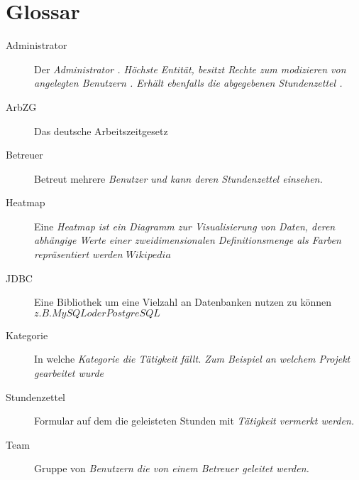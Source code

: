 \section{Glossar}
\begin{description}
	\item[Administrator] Der \em Administrator \em . Höchste Entität, besitzt Rechte zum modizieren von angelegten \em Benutzern \em .
	               Erhält ebenfalls die \em abgegebenen Stundenzettel \em .

	\item[ArbZG] Das deutsche Arbeitszeitgesetz

	\item[Betreuer] Betreut mehrere \em Benutzer \em  und kann deren \em Stundenzettel \em  einsehen.

	\item[Heatmap] Eine \em Heatmap \em  ist ein Diagramm zur Visualisierung von Daten, deren abhängige Werte einer zweidimensionalen Definitionsmenge als Farben repräsentiert werden \em \(Wikipedia\) \em

	\item[JDBC] Eine Bibliothek um eine Vielzahl an Datenbanken nutzen zu können \(z.B. MySQL oder PostgreSQL\)

	\item[Kategorie] In welche \em Kategorie \em  die \em Tätigkeit \em  fällt. Zum Beispiel an welchem Projekt gearbeitet wurde

	\item[Stundenzettel] Formular auf dem die geleisteten Stunden mit \em Tätigkeit \em  vermerkt werden.

	\item[Team] Gruppe von \em Benutzern \em  die von einem \em Betreuer \em  geleitet werden.

\end{description}

